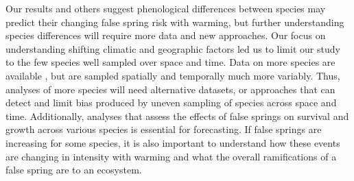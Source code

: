 \documentclass{article}\usepackage[]{graphicx}\usepackage[]{color}
\begin{document}


Our results and others \citep{Ma2018} suggest phenological differences between species may predict their changing false spring risk with warming, but further understanding species differences will require more data and new approaches. Our focus on understanding shifting climatic and geographic factors led us to limit our study to the few species well sampled over space and time. Data on more species are available \citep[e.g., ][]{Ma2018}, but are sampled spatially and temporally much more variably. Thus, analyses of more species will need alternative datasets, or approaches that can detect and limit bias produced by uneven sampling of species across space and time. Additionally, analyses that assess the effects of false springs on survival and growth across various species is essential for forecasting. If false springs are increasing for some species, it is also important to understand how these events are changing in intensity with warming and what the overall ramifications of a false spring are to an ecosystem. 
\end{document}
